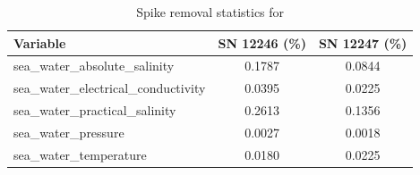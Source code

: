 \begin{table}[h]
\centering
\caption{Spike removal statistics for \projectname{} \casenumber{}}
\label{tab:spike_stats}
\begin{tabular}{|l|c|c|}
\hline
Variable & SN 12246 (\%) & SN 12247 (\%) \\
\hline
sea\_water\_absolute\_salinity & 0.1787 & 0.0844 \\
sea\_water\_electrical\_conductivity & 0.0395 & 0.0225 \\
sea\_water\_practical\_salinity & 0.2613 & 0.1356 \\
sea\_water\_pressure & 0.0027 & 0.0018 \\
sea\_water\_temperature & 0.0180 & 0.0225 \\
\hline
\end{tabular}
\end{table}
